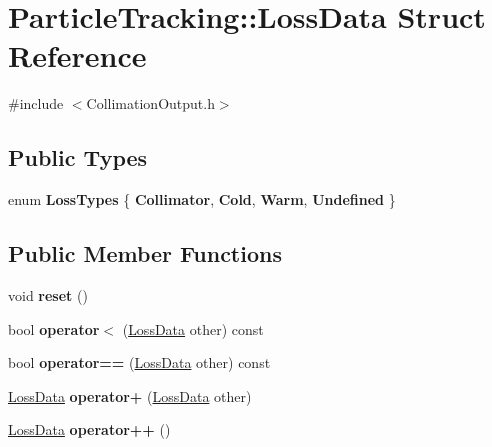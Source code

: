 \hypertarget{structParticleTracking_1_1LossData}{}\section{Particle\+Tracking\+:\+:Loss\+Data Struct Reference}
\label{structParticleTracking_1_1LossData}


{\ttfamily \#include $<$Collimation\+Output.\+h$>$}

\subsection*{Public Types}
\begin{DoxyCompactItemize}
\item 
\mbox{\label{structParticleTracking_1_1LossData_a8dcd8174abff8de1215d83b0eb04f0e9}} 
enum {\bfseries Loss\+Types} \{ {\bfseries Collimator}, 
{\bfseries Cold}, 
{\bfseries Warm}, 
{\bfseries Undefined}
 \}
\end{DoxyCompactItemize}
\subsection*{Public Member Functions}
\begin{DoxyCompactItemize}
\item 
\mbox{\label{structParticleTracking_1_1LossData_a7ecfecc575103b3d4db3283bdff7927b}} 
void {\bfseries reset} ()
\item 
\mbox{\label{structParticleTracking_1_1LossData_af8e7bb0763178724ca6280e23d9484d0}} 
bool {\bfseries operator$<$} (\hyperlink{structParticleTracking_1_1LossData}{Loss\+Data} other) const
\item 
\mbox{\label{structParticleTracking_1_1LossData_ab305b8624aee035f8fc3b74e29816a01}} 
bool {\bfseries operator==} (\hyperlink{structParticleTracking_1_1LossData}{Loss\+Data} other) const
\item 
\mbox{\label{structParticleTracking_1_1LossData_a576ba6416592fb5cd87b5423260c769c}} 
\hyperlink{structParticleTracking_1_1LossData}{Loss\+Data} {\bfseries operator+} (\hyperlink{structParticleTracking_1_1LossData}{Loss\+Data} other)
\item 
\mbox{\label{structParticleTracking_1_1LossData_a2ac74c648271fe06e904fbb56878bf07}} 
\hyperlink{structParticleTracking_1_1LossData}{Loss\+Data} {\bfseries operator++} ()
\end{DoxyCompactItemize}
